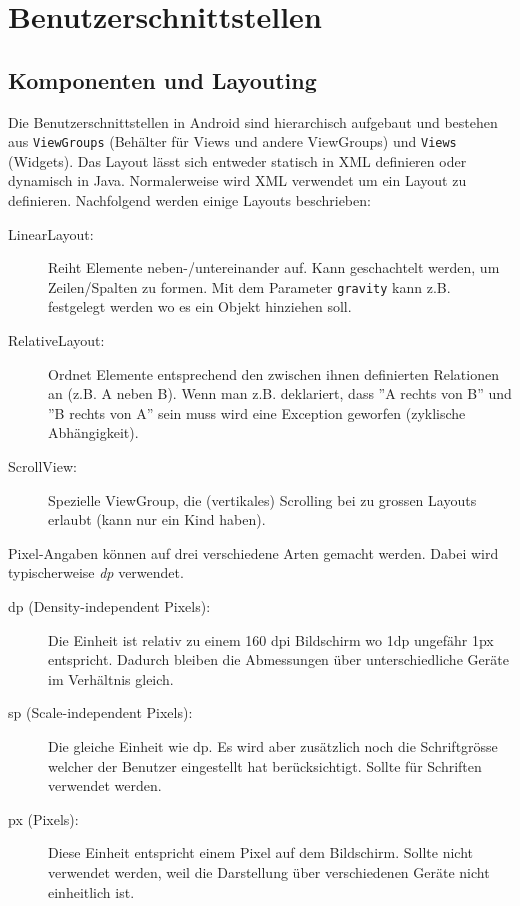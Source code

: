 \chapter{Benutzerschnittstellen}

\section{Komponenten und Layouting}

Die Benutzerschnittstellen in Android sind hierarchisch aufgebaut und bestehen aus \texttt{ViewGroups} (Behälter für Views und andere ViewGroups) und \texttt{Views} (Widgets). Das Layout lässt sich entweder statisch in XML definieren oder dynamisch in Java. Normalerweise wird XML verwendet um ein Layout zu definieren. Nachfolgend werden einige Layouts beschrieben:
\begin{description}
	\item[LinearLayout:] Reiht Elemente neben-/untereinander auf. Kann geschachtelt werden, um Zeilen/Spalten zu formen. Mit dem Parameter \texttt{gravity} kann z.B. festgelegt werden wo es ein Objekt hinziehen soll.
	\item[RelativeLayout:] Ordnet Elemente entsprechend den zwischen ihnen definierten Relationen an (z.B. A neben B). Wenn man z.B. deklariert, dass ''A rechts von B'' und ''B rechts von A'' sein muss wird eine Exception geworfen (zyklische Abhängigkeit).
	\item[ScrollView:] Spezielle ViewGroup, die (vertikales) Scrolling bei zu grossen Layouts erlaubt (kann nur ein Kind haben).
\end{description}
Pixel-Angaben können auf drei verschiedene Arten gemacht werden. Dabei wird typischerweise \emph{dp} verwendet.
\begin{description}
	\item[dp (Density-independent Pixels):] Die Einheit ist relativ zu einem 160 dpi Bildschirm wo 1dp ungefähr 1px entspricht. Dadurch bleiben die Abmessungen über unterschiedliche Geräte im Verhältnis gleich.
	\item[sp (Scale-independent Pixels):] Die gleiche Einheit wie dp. Es wird aber zusätzlich noch die Schriftgrösse welcher der Benutzer eingestellt hat berücksichtigt. Sollte für Schriften verwendet werden.
	\item[px (Pixels):] Diese Einheit entspricht einem Pixel auf dem Bildschirm. Sollte nicht verwendet werden, weil die Darstellung über verschiedenen Geräte nicht einheitlich ist.
\end{description}


